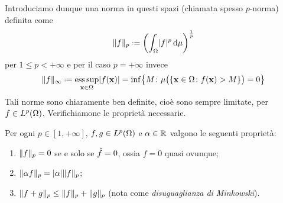 Introduciamo dunque una norma in questi spazi (chiamata spesso $p$-norma) definita come
\begin{equation}
    \norm{f}_p\defeq\biggl(\int_\Omega \abs{f}^p\,\dd\mu\biggr)^{\frac1{p}}
    \label{eq:p-norma-finita}
\end{equation}
per $1\le p<+\infty$ e per il caso $p=+\infty$ invece
\begin{equation}
    \norm{f}_\infty\defeq\esssup_{\vec x\in\Omega}\abs{f(\vec x)}=\inf\bigl\{M\colon\mu\bigl(\{\vec x\in\Omega\colon f(\vec x)>M\}\bigr)=0\bigr\}
    \label{eq:p-norma-infinita}
\end{equation}
Tali norme sono chiaramente ben definite, cioè sono sempre limitate, per $f\in\leb[p]{\Omega}$.
Verifichiamone le proprietà necessarie.
\begin{proprieta} \label{pr:norma}
    Per ogni $p\in[1,+\infty]$, $f,g\in\leb[p]{\Omega}$ e $\alpha\in\R$ valgono le seguenti proprietà:
    \begin{enumerate}
        \item $\norm{f}_p=0$ se e solo se $\eqc{f}=0$, ossia $f=0$ quasi ovunque;
        \item $\norm{\alpha f}_p=\abs{\alpha}\norm{f}_p$;
        \item $\norm{f+g}_p\le\norm{f}_p+\norm{g}_p$ (nota come \emph{disuguaglianza di Minkowski}).
    \end{enumerate}
\end{proprieta}
